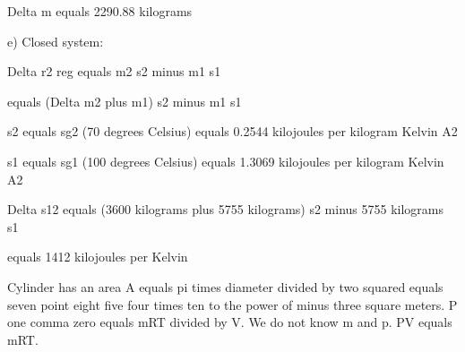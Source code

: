 Delta m equals 2290.88 kilograms

e) Closed system:

Delta r2 reg equals m2 s2 minus m1 s1

equals (Delta m2 plus m1) s2 minus m1 s1

s2 equals sg2 (70 degrees Celsius) equals 0.2544 kilojoules per kilogram Kelvin A2

s1 equals sg1 (100 degrees Celsius) equals 1.3069 kilojoules per kilogram Kelvin A2

Delta s12 equals (3600 kilograms plus 5755 kilograms) s2 minus 5755 kilograms s1

equals 1412 kilojoules per Kelvin

Cylinder has an area A equals pi times diameter divided by two squared equals seven point eight five four times ten to the power of minus three square meters. P one comma zero equals mRT divided by V. We do not know m and p. PV equals mRT.